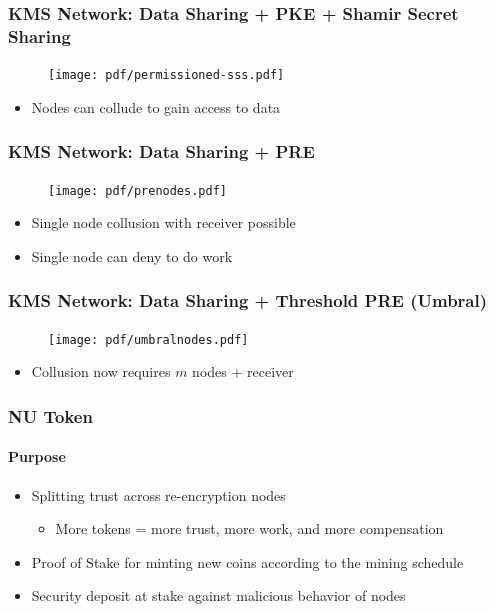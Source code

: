 \documentclass[xetex,mathsans,sans,aspectratio=169]{beamer}
\begin{document}
    \begin{frame}
        \frametitle{KMS Network: Data Sharing + PKE + Shamir Secret Sharing}
        \begin{figure}
            \centering
            \texttt{[image: pdf/permissioned-sss.pdf]}
        \end{figure}
        \begin{itemize}
            \item Nodes can collude to gain access to data
        \end{itemize}
    \end{frame}

    \begin{frame}
        \frametitle{KMS Network: Data Sharing + PRE}
        \begin{figure}
            \centering
            \texttt{[image: pdf/prenodes.pdf]}
        \end{figure}
        \begin{itemize}
            \item Single node collusion with receiver possible
            \item Single node can deny to do work
        \end{itemize}
    \end{frame}

    \begin{frame}
        \frametitle{KMS Network: Data Sharing + Threshold PRE (Umbral)}
        \begin{figure}
            \centering
            \texttt{[image: pdf/umbralnodes.pdf]}
        \end{figure}
        \begin{itemize}
            \item Collusion now requires $m$ nodes + receiver
        \end{itemize}
    \end{frame}

    \begin{frame}
        \frametitle{NU Token}
        \framesubtitle{Purpose}
        \begin{itemize}
            \setlength\itemsep{1em}
            \item Splitting trust across re-encryption nodes 
            \begin{itemize}
              \item More tokens = more trust, more work, and more compensation
            \end{itemize}
            \item Proof of Stake for minting new coins according to the mining schedule
            \item Security deposit at stake against malicious behavior of nodes
        \end{itemize}
    \end{frame}
\end{document}
